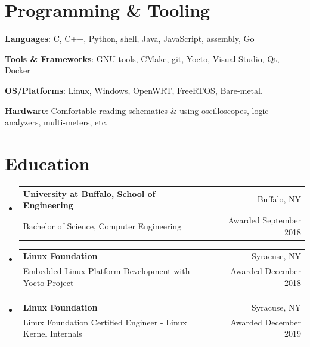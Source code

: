 \documentclass[letterpaper,11pt]{article}
\makeatletter
\newcommand{\resumeSubheading}[4]{
	\vspace{-1pt}\item
	\begin{tabular*}{0.97\textwidth}{l@{\extracolsep{\fill}}r}
		\textbf{#1} & #2 \\
		#3 & #4 \\
	\end{tabular*}
	\vspace{-5pt}
}
\newcommand{\resumeSubHeadingListStart}{\begin{itemize}[leftmargin=*]}
\newcommand{\resumeSubHeadingListEnd}{\end{itemize}}
\makeatother
\begin{document}
	
	
	\section{Programming \& Tooling}
	\resumeSubHeadingListStart
	\item{
		\textbf{Languages}{: C, C++, Python, shell, Java, JavaScript, assembly, Go} }
	\hfill
	\item{
		\textbf{Tools \& Frameworks}{: GNU tools, CMake, git, Yocto, Visual Studio, Qt, Docker
		}
		\item{
			\textbf{OS/Platforms}{: Linux, Windows, OpenWRT, FreeRTOS, Bare-metal.} }
		\item {
			\textbf{Hardware}{: Comfortable reading schematics \& using oscilloscopes, logic analyzers, multi-meters, etc.}}
		

	} 
	\resumeSubHeadingListEnd
	
	\section{Education}
	\resumeSubHeadingListStart
	\resumeSubheading
	{University at Buffalo, School of Engineering}{Buffalo, NY}
	{Bachelor of Science, Computer Engineering}{Awarded September 2018}
	\resumeSubheading
	{Linux Foundation}{Syracuse, NY}
	{Embedded Linux Platform Development with Yocto Project}{Awarded December 2018}
	\resumeSubheading
	{Linux Foundation}{Syracuse, NY}
	{Linux Foundation Certified Engineer - Linux Kernel Internals}{Awarded December 2019}
	\resumeSubHeadingListEnd
	
	
		
		
	
\end{document}
